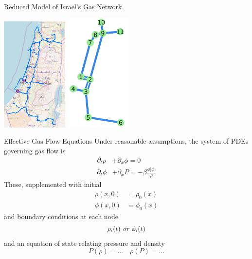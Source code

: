 \begin{frame}{Reduced Model of Israel's Gas Network}
  \begin{center}
    \includegraphics[width=0.25\textwidth]{fullModel.png}
    \includegraphics[width=0.25\textwidth]{reducedModel.png}
  \end{center}
\end{frame}

\begin{frame}{Effective Gas Flow Equations}
  Under reasonable assumptions, the system of PDEs governing gas flow is 
  \begin{align}
    \partial_t \rho & + \partial_x \phi = 0\\
    \partial_t \phi & + \partial_x P = -\beta \frac{\phi|\phi|}{\rho}
  \end{align}
  These, supplemented with initial
  \begin{align}
    \rho(x,0) &= \rho_0(x)\\
    \phi(x,0) &= \phi_0(x)
  \end{align}
  and boundary conditions at each node
  \begin{equation}
    \rho_i(t) \text{ \emph{or} } \phi_i(t)
  \end{equation}
  and an equation of state relating pressure and density
  \begin{equation}
    P(\rho) = ... \quad \rho(P) = ...
  \end{equation}
\end{frame}

